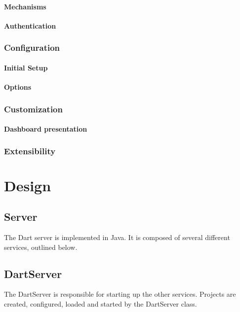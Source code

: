 \documentclass{InsightBook}
\begin{document}
\subsubsection{Mechanisms}
\subsubsection{Authentication}

\subsection{Configuration}
\subsubsection{Initial Setup}
\subsubsection{Options}

\subsection{Customization}
  \subsubsection{Dashboard presentation}
\subsection{Extensibility}



\chapter{Design}

\section{Server}
The Dart server is implemented in Java.  It is composed of several
different services, outlined below.

\section{DartServer}
The DartServer is responsible for starting up the other services.
Projects are created, configured, loaded and started by the DartServer
class.
\end{document}
